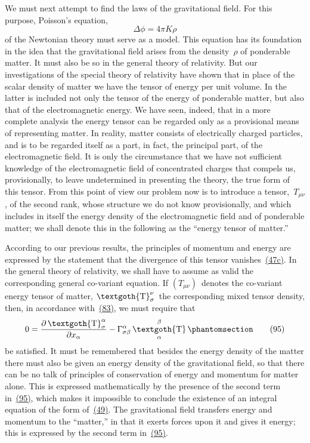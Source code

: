 \documentclass[12pt]{book}[2005/09/16]
\newcommand{\PageSep}[1]{\ignorespaces}
\newcommand{\Tag}[1]{%
  \phantomsection
  \label{eqn:#1}
  \tag*{#1}
}
\newcommand{\Eqref}[1]{\hyperref[eqn:#1]{#1}}
\newcommand{\dd}{\partial}
\newcommand{\Tensor}[1]{\textgoth{#1}}
\DeclareMathOperator{\tT}{\Tensor{T}}
\begin{document}
We must next attempt to find the laws of the gravitational
field. For this purpose, Poisson's equation,
%
\[
\Delta\phi = 4\pi K\rho
\]
of the Newtonian theory must serve as a model. This
equation has its foundation in the idea that the gravitational
field arises from the density~$\rho$ of ponderable
matter. It must also be so in the general theory of
relativity. But our investigations of the special theory
of relativity have shown that in place of the scalar
density of matter we have the tensor of energy per unit
volume. In the latter is included not only the tensor
of the energy of ponderable matter, but also that of the
electromagnetic energy. We have seen, indeed, that
in a more complete analysis the energy tensor can be
regarded only as a provisional means of representing
\PageSep{91}
matter. In reality, matter consists of electrically charged
particles, and is to be regarded itself as a part, in fact,
the principal part, of the electromagnetic field. It is
only the circumstance that we have not sufficient knowledge
of the electromagnetic field of concentrated charges
that compels us, provisionally, to leave undetermined
in presenting the theory, the true form of this tensor.
From this point of view our problem now is to introduce
a tensor,~$T_{\mu\nu}$, of the second rank, whose structure we do
not know provisionally, and which includes in itself the
energy density of the electromagnetic field and of ponderable
matter; we shall denote this in the following as
the ``energy tensor of matter.''

According to our previous results, the principles of
momentum and energy are expressed by the statement
that the divergence of this tensor vanishes~\Eqref{(47c)}. In
the general theory of relativity, we shall have to assume
as valid the corresponding general co-variant equation.
If $(T_{\mu\nu})$~denotes the co-variant energy tensor of matter,
$\tT_{\sigma}^{\nu}$~the corresponding mixed tensor density, then, in
accordance with~\Eqref{(83)}, we must require that
\[
0 = \frac{\dd \tT_{\sigma}^{\alpha}}{\dd x_{\alpha}}
  - \Gamma_{\sigma\beta}^{\alpha} \tT_{\alpha}^{\beta}
\Tag{(95)}
\]
be satisfied. It must be remembered that besides the
energy density of the matter there must also be given
an energy density of the gravitational field, so that there
can be no talk of principles of conservation of energy
and momentum for matter alone. This is expressed
mathematically by the presence of the second term in~\Eqref{(95)},
\PageSep{92}
which makes it impossible to conclude the existence
of an integral equation of the form of~\Eqref{(49)}. The gravitational
field transfers energy and momentum to the
``matter,'' in that it exerts forces upon it and gives it
energy; this is expressed by the second term in~\Eqref{(95)}.
\end{document}
